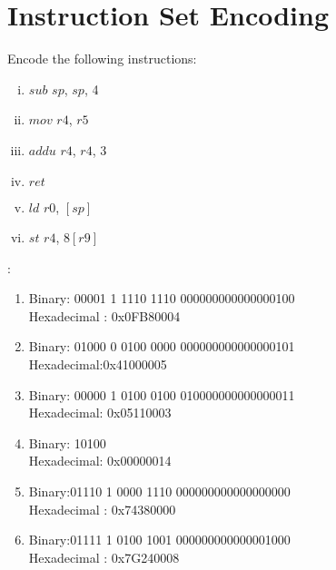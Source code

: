\section*{Instruction Set Encoding}

\begin{ExerciseList}

\Exercise Encode the following \simplerisc instructions:

\begin{enumerate}[i) ]
\item $sub$ $sp$, $sp$, 4
\item $mov$ $r4$, $r5$
\item $addu$ $r4$, $r4$, 3
\item $ret$
\item $ld$ $r0$, $[sp]$
\item $st$ $r4$, $8[r9]$
\end{enumerate}
\Answer :
\begin{enumerate}
\item Binary: 00001 1 1110 1110 000000000000000100\\
Hexadecimal : 0x0FB80004  
\item Binary: 01000 0 0100 0000 000000000000000101\\
Hexadecimal:0x41000005
\item Binary: 00000 1 0100 0100 010000000000000011\\
Hexadecimal: 0x05110003
\item Binary: 10100\\
Hexadecimal: 0x00000014
\item Binary:01110 1 0000 1110 000000000000000000\\
Hexadecimal : 0x74380000
\item Binary:01111 1 0100 1001 000000000000001000\\
Hexadecimal : 0x7G240008
\end{enumerate}

\end{ExerciseList}
